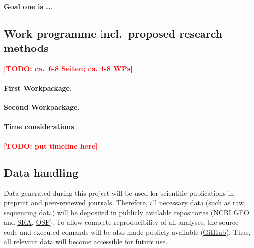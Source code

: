 \documentclass{scrartcl}
\newcommand{\todo}[1]{\xspace{\textcolor{red}{\bfseries[TODO: #1]}}\xspace}
\begin{document}
\paragraph{\textnormal{Goal one is ...}}

\subsection{Work programme incl.\ proposed research methods}
\todo{ca.\ 6-8 Seiten; ca. 4-8 WPs}

\addtocounter{secnumdepth}{1}
\renewcommand{\theparagraph}{WP\arabic{paragraph}}

\paragraph{First Workpackage.}
\label{wp:1}
\lipsum[2]

\paragraph{Second Workpackage.}
\label{wp:2}
\lipsum[5]



\let\theparagraph=\oldpara
\paragraph*{Time considerations}
\todo{put timeline here}

\subsection{Data handling}
Data generated during this project will be used for scientific publications in
preprint and peer-reviewed journals. Therefore, all necessary data (such as raw
sequencing data) will be deposited in publicly available repositories
(\href{https://www.ncbi.nlm.nih.gov/geo/}{NCBI GEO} and
\href{https://www.ncbi.nlm.nih.gov/sra}{SRA}, \href{https://osf.io/}{OSF}). To
allow complete reproducibility of all analyses, the source code and executed
comands will be also made publicly available
(\href{https://github.com/}{GitHub}).  Thus, all relevant data will become
accessible for future use. 
\end{document}
